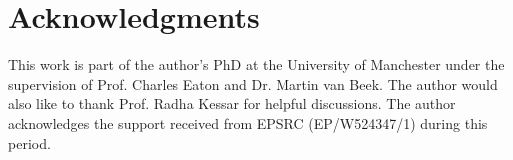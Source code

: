 \documentclass[bysection, amsart]{standard}
\begin{document}
\section*{Acknowledgments}
This work is part of the author's PhD at the University of Manchester under the supervision of Prof. Charles Eaton and Dr. Martin van Beek. The author would also like to thank Prof. Radha Kessar for helpful discussions. The author acknowledges the support received from EPSRC (EP/W524347/1) during this period. 



\end{document}
